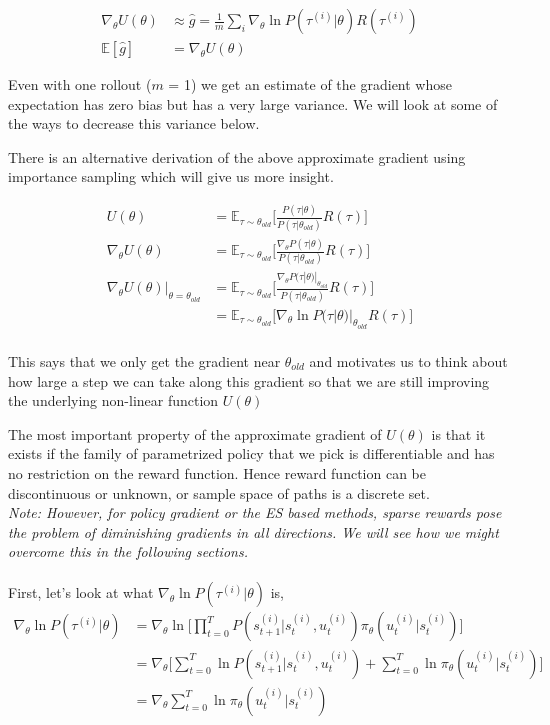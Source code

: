 \documentclass{article}[11pt]
\begin{document}
\begin{align*}
\nabla_\theta U(\theta) &\approx \hat{g} = \frac{1}{m} \sum_i \nabla_\theta \ln P(\tau^{(i)}|\theta) R(\tau^{(i)})\\
\mathbb{E}[\hat{g}] &= \nabla_\theta U(\theta)
\end{align*}

Even with one rollout ($m$ = 1) we get an estimate of the gradient whose expectation has zero bias but has a very large variance. We will look at some of the ways to decrease this variance below.

There is an alternative derivation of the above approximate gradient using importance sampling which will give us more insight.

\begin{align*}
U(\theta) &= \mathbb{E}_{\tau \sim \theta_{old}} \Big [\frac{P(\tau|\theta)}{P(\tau|\theta_{old})}R(\tau) \Big] \\
\nabla_\theta U(\theta)&=\mathbb{E}_{\tau \sim \theta_{old}} \Big [\frac{\nabla_\theta P(\tau|\theta)}{P(\tau|\theta_{old})}R(\tau) \Big] \\
\nabla_\theta U(\theta)|_{\theta=\theta_{old}}&=\mathbb{E}_{\tau \sim \theta_{old}} \Big [\frac{\nabla_\theta P(\tau|\theta)|_{\theta_{old}}}{P(\tau|\theta_{old})}R(\tau) \Big] \\
&=\mathbb{E}_{\tau \sim \theta_{old}} \big [\nabla_\theta \ln P(\tau|\theta)|_{\theta_{old}}R(\tau) \big] \\
\end{align*}

This says that we only get the gradient near $\theta_{old}$ and motivates us to think about how large a step we can take along this gradient so that we are still improving the underlying non-linear function $U(\theta)$

The most important property of the approximate gradient of $U(\theta)$ is that it exists if the family of parametrized policy that we pick is differentiable and has no restriction on the reward function. Hence reward function can be discontinuous or unknown, or sample space of paths is a discrete set. \\ \textit{Note: However, for policy gradient or the ES based methods, sparse rewards pose the problem of diminishing gradients in all directions. We will see how we might overcome this in the following sections. 
}\\ \\

First, let's look at what $\nabla_\theta \ln P(\tau^{(i)}|\theta)$ is,
\begin{align*}
\nabla_\theta \ln P(\tau^{(i)}|\theta) &= \nabla_\theta \ln \Big[\prod_{t=0}^TP(s_{t+1}^{(i)}|s_{t}^{(i)}, u_{t}^{(i)}) \pi_\theta(u_{t}^{(i)}|s_{t}^{(i)}) \Big]\\
&= \nabla_\theta \Big[\sum_{t=0}^T \ln P(s_{t+1}^{(i)}|s_{t}^{(i)}, u_{t}^{(i)}) + \sum_{t=0}^T \ln \pi_\theta(u_{t}^{(i)}|s_{t}^{(i)}) \Big] \\
&= \nabla_\theta \sum_{t=0}^T \ln \pi_\theta(u_{t}^{(i)}|s_{t}^{(i)})
\end{align*}
\end{document}
